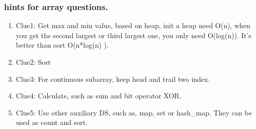 \documentclass[a4paper,11pt,twoside]{book}
\begin{document}
\subsubsection{hints for array questions.}

\begin{enumerate}
\item Clue1: Get max and min value, based on heap, init a heap need O(n), when you get the second largest or third largest one, you only need O(log(n)). It's better than sort O(n*log(n) ). 

\item Clue2: Sort
\item Clue3: For continuous subarray, keep head and trail two index.
\item Clue4: Calculate, such as sum and bit operator XOR. 
\item Clue5: Use other auxiliary DS, such as, map, set or hash\_map.  They can be used as count and sort. 
\end{enumerate}
\end{document}
